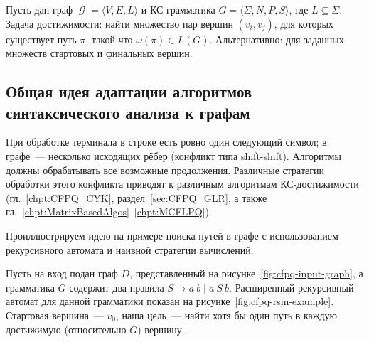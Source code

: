 Пусть дан граф $\mscrG = \langle V, E, L \rangle$ и КС-грамматика $G = \langle \Sigma, N, P, S \rangle$, где $L \subseteq \Sigma$.
Задача достижимости: найти множество пар вершин $(v_i, v_j)$, для которых существует путь $\pi$, такой что $\omega(\pi) \in L(G)$.
Альтернативно: для заданных множеств стартовых и финальных вершин.

\subsection{Общая идея адаптации алгоритмов синтаксического анализа к графам}

При обработке терминала в строке есть ровно один следующий символ; в графе~--- несколько исходящих рёбер (конфликт типа shift-shift).
Алгоритмы должны обрабатывать все возможные продолжения.
Различные стратегии обработки этого конфликта приводят к различным алгоритмам КС-достижимости (гл.~\ref{chpt:CFPQ_CYK}, раздел~\ref{sec:CFPQ_GLR}, а также гл.~\ref{chpt:MatrixBasedAlgos}--\ref{chpt:MCFLPQ}).

Проиллюстрируем идею на примере поиска путей в графе с использованием рекурсивного автомата и наивной стратегии вычислений.
\begin{marginfigure}
    \begin{center}
        \resizebox{\marginparwidth}{!}{
            
        }
    \end{center}
    \caption{Расширенный рекурсивный автомат для грамматики $S \to a \ b \mid a \ S \ b$}
    \label{fig:cfpq-rsm-example}
\end{marginfigure}

\begin{marginfigure}
    \begin{center}
        
    \end{center}
    \caption{Пример входного графа}
    \label{fig:cfpq-input-graph}
\end{marginfigure}

Пусть на вход подан граф $D$, представленный на рисунке~\ref{fig:cfpq-input-graph}, а грамматика $G$ содержит два правила $S \to a \ b \mid a \ S \ b$.
Расширенный рекурсивный автомат для данной грамматики показан на рисунке~\ref{fig:cfpq-rsm-example}.
Стартовая вершина~--- $v_0$, наша цель~--- найти хотя бы один путь в каждую достижимую (относительно $G$) вершину.

